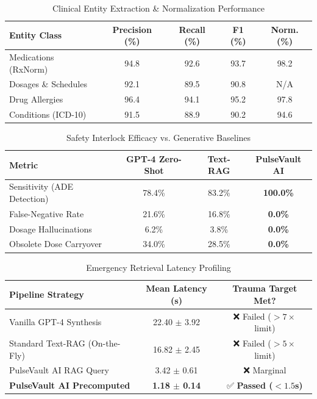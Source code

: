 \documentclass[journal]{IEEEtran}
\begin{document}
\begin{table}[t]
\caption{Clinical Entity Extraction \& Normalization Performance}
\label{tab:ner_perf}
\centering
\begin{tabular}{lcccc}
\toprule
\textbf{Entity Class} & \textbf{Precision (\%)} & \textbf{Recall (\%)} & \textbf{F1 (\%)} & \textbf{Norm. (\%)} \\
\midrule
Medications (RxNorm) & 94.8 & 92.6 & 93.7 & 98.2 \\
Dosages \& Schedules & 92.1 & 89.5 & 90.8 & N/A \\
Drug Allergies       & 96.4 & 94.1 & 95.2 & 97.8 \\
Conditions (ICD-10)  & 91.5 & 88.9 & 90.2 & 94.6 \\
\bottomrule
\end{tabular}
\end{table}

\begin{table}[t]
\caption{Safety Interlock Efficacy vs. Generative Baselines}
\label{tab:safety_perf}
\centering
\begin{tabular}{lccc}
\toprule
\textbf{Metric} & \textbf{GPT-4 Zero-Shot} & \textbf{Text-RAG} & \textbf{PulseVault AI} \\
\midrule
Sensitivity (ADE Detection) & 78.4\% & 83.2\% & \textbf{100.0\%} \\
False-Negative Rate         & 21.6\% & 16.8\% & \textbf{0.0\%} \\
Dosage Hallucinations       & 6.2\%  & 3.8\%  & \textbf{0.0\%} \\
Obsolete Dose Carryover     & 34.0\% & 28.5\% & \textbf{0.0\%} \\
\bottomrule
\end{tabular}
\end{table}

\begin{table}[t]
\caption{Emergency Retrieval Latency Profiling}
\label{tab:latency_perf}
\centering
\begin{tabular}{lcc}
\toprule
\textbf{Pipeline Strategy} & \textbf{Mean Latency (s)} & \textbf{Trauma Target Met?} \\
\midrule
Vanilla GPT-4 Synthesis     & 22.40 $\pm$ 3.92 & ❌ Failed ($>7\times$ limit) \\
Standard Text-RAG (On-the-Fly)& 16.82 $\pm$ 2.45 & ❌ Failed ($>5\times$ limit) \\
PulseVault AI RAG Query     & 3.42 $\pm$ 0.61  & ❌ Marginal \\
\textbf{PulseVault AI Precomputed}& \textbf{1.18 $\pm$ 0.14} & ✅ \textbf{Passed ($<1.5$s)} \\
\bottomrule
\end{tabular}
\end{table}
\end{document}

